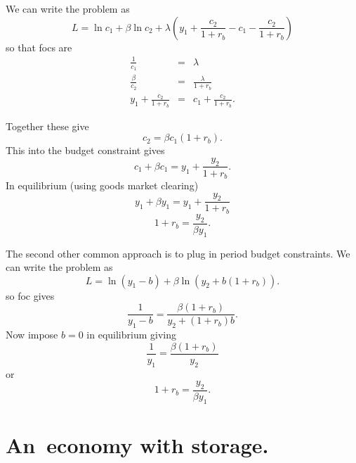 \documentclass{sebase}
\begin{document}
We can write the problem as 
\begin{equation*}
L=\ln c_{1}+\beta \ln c_{2}+\lambda \left( y_{1}+\frac{c_{2}}{1+r_{b}}-c_{1}-%
\frac{c_{2}}{1+r_{b}}\right)
\end{equation*}%
so that focs are%
\begin{eqnarray*}
\frac{1}{c_{1}} &=&\lambda \\
\frac{\beta }{c_{2}} &=&\frac{\lambda }{1+r_{b}} \\
y_{1}+\frac{c_{2}}{1+r_{b}} &=&c_{1}+\frac{c_{2}}{1+r_{b}}.
\end{eqnarray*}%
\pagebreak

Together these give 
\begin{equation*}
c_{2}=\beta c_{1}\left( 1+r_{b}\right) .
\end{equation*}%
This into the budget constraint gives%
\begin{equation*}
c_{1}+\beta c_{1}=y_{1}+\frac{y_{2}}{1+r_{b}}.
\end{equation*}%
In equilibrium (using goods market clearing) 
\begin{equation*}
y_{1}+\beta y_{1}=y_{1}+\frac{y_{2}}{1+r_{b}}
\end{equation*}%
\begin{equation*}
1+r_{b}=\frac{y_{2}}{\beta y_{1}}.
\end{equation*}%
\pagebreak

The second other common approach is to plug in period budget constraints. We
can write the problem as%
\begin{equation*}
L=\ln \left( y_{1}-b\right) +\beta \ln \left( y_{2}+b\left( 1+r_{b}\right)
\right) .
\end{equation*}%
so foc gives 
\begin{equation*}
\frac{1}{y_{1}-b}=\frac{\beta \left( 1+r_{b}\right) }{y_{2}+\left(
1+r_{b}\right) b}.
\end{equation*}%
Now impose $b=0$ in equilibrium giving 
\begin{equation*}
\frac{1}{y_{1}}=\frac{\beta \left( 1+r_{b}\right) }{y_{2}}
\end{equation*}%
or 
\begin{equation*}
1+r_{b}=\frac{y_{2}}{\beta y_{1}}.
\end{equation*}%
\pagebreak

\section{An\ economy with storage.}
\end{document}
